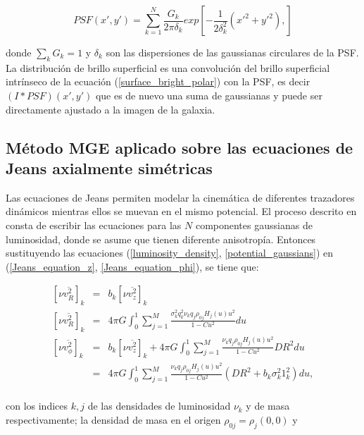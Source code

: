 \begin{equation}
PSF(x', y') = \sum_{k = 1}^N \frac{G_k}{2\pi \delta_k} exp \left[ -\frac{1}{2 \delta_k^2} \left( x'^2 + y'^2 \right), \right]
\end{equation}

donde $\sum_k G_k = 1$ y $\delta_k$ son las dispersiones de las gaussianas circulares de la PSF. La distribución de brillo superficial es una convolución del brillo superficial intrínseco de la ecuación (\ref{surface_bright_polar}) con la PSF, es decir $(I * PSF)(x', y')$ que es de nuevo una suma de gaussianas y puede ser directamente ajustado a la imagen de la galaxia.


\subsection{Método MGE aplicado sobre las ecuaciones de Jeans axialmente simétricas}

Las ecuaciones de Jeans permiten modelar la cinemática de diferentes trazadores dinámicos mientras ellos se muevan en el mismo potencial. El proceso descrito en \cite{2008MNRAS.390_71C} consta de escribir las ecuaciones para las $N$ componentes gaussianas de luminosidad, donde se asume que tienen diferente anisotropía. Entonces sustituyendo las ecuaciones (\ref{luminosity_density}, \ref{potential_gaussians}) en (\ref{Jeans_equation_z}, \ref{Jeans_equation_phi}), se tiene que:

\begin{eqnarray}
\label{component_bright_vel_1}
\left[\nu \overline{v_R^2} \right]_k &=& b_k \left[\nu \overline{v_z^2} \right]_k \\
\label{component_bright_vel_2}
\left[\nu \overline{v_R^2} \right]_k &=& 4\pi G \int_0^1 \sum_{j=1}^{M} \frac{ \sigma_k^2 q_k^2 \nu_k q_j \rho_{0j} H_j(u) u^2 }{ 1-Cu^2 } du \\
\label{component_bright_vel_3}
\left[ \nu \overline{v_{\phi}^2} \right]_k &=& b_k \left[ \nu \overline{v_z^2} \right]_k + 4\pi G \int_0^1 \sum_{j=1}^{M} \frac{ \nu_k q_j \rho_{0j} H_j(u) u^2 }{ 1-Cu^2 } D R^2 du \\
\label{component_bright_vel_4}
 & = & 4\pi G \int_0^1 \sum_{j=1}^{M} \frac{ \nu_k q_j \rho_{0j} H_j(u) u^2 }{ 1-Cu^2 } (D R^2 + b_k \sigma_k^2 1_k^2) du, \\
\end{eqnarray}

con los indices $k,j$ de las densidades de luminosidad $\nu_k$ y de masa respectivamente; la densidad de masa en el origen $\rho_{0j} = \rho_j(0,0)$ y 

